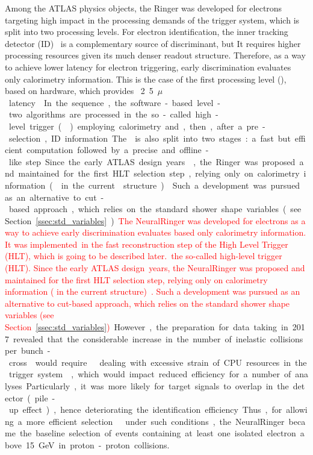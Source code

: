 Among the ATLAS physics objects, the Ringer was developed for electrons targeting high impact in the processing demands of the trigger system, which is split into two processing levels.  For electron identification, the inner tracking detector (ID)~\cite{PERF-2007-01} is a complementary source of discriminant, but It requires higher processing resources given its much denser readout structure.  Therefore, as a way to achieve lower latency for electron triggering, early discrimination evaluates only calorimetry information. This is the case of the first processing level (\licalo), based on hardware, which provides \SI{}2.5{$\mu$} latency~\cite{TRIG-2016-01}. In the sequence, the software-based level-two algorithms are processed in the so-called high-level trigger (\hlt{}) employing calorimetry and, then, after a pre-selection, ID information.  The \hlt{} is also split into two stages: a fast but efficient computation followed by a precise and offline-like step. Since the early ATLAS design years~\cite{1995_seixas_ringer}, the Ringer was proposed and maintained for the first HLT selection step, relying only on calorimetry information (\fastcalo{} in the current \hlt{} structure)~\cite{TRIG-2016-01}.  Such a development was pursued as an alternative to cut-based approach, which relies on the standard shower shape variables (see Section~\ref{ssec:std_variables}).
\textcolor{red}{The NeuralRinger was developed for electrons as a way to achieve early discrimination evaluates based only calorimetry information. It was implemented in the fast reconstruction step of the High Level Trigger (HLT), which is going to be described later. the so-called high-level trigger (HLT). Since the early ATLAS design years, the NeuralRinger was proposed and  maintained for the first HLT selection step, relying only on calorimetry information (\fastcalo{} in the current \hlt{} structure)~\cite{TRIG-2016-01}.  Such a development was pursued as an alternative to cut-based approach, which relies on the standard shower shape variables (see Section~\ref{ssec:std_variables})}.

However, the preparation for data taking in 2017 revealed that the considerable increase in the number of inelastic collisions per bunch-cross~\cite{DAPR-2013-01} would require dealing with excessive strain of CPU resources in the trigger system~\cite{ATL-DAQ-PUB-2018-002}, which would impact reduced efficiency for a number of analyses. Particularly, it was more likely for target  signals to overlap in the detector (pile-up effect), hence deteriorating the identification efficiency. Thus, for allowing a more efficient selection under such conditions, the NeuralRinger became the baseline selection of events containing at least one isolated electron above \SI{15}{\GeV} in proton-proton collisions.


